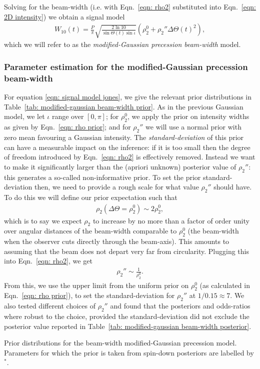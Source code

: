 \documentclass[../full_thesis/full_thesis.tex]{subfiles}
\newcommand{\thisdir}{../comparing_periodic_modulations}
\begin{document}
Solving for the beam-width (i.e. with Eqn.~\eqref{eqn: rho2} substituted into
Eqn.~\eqref{eqn: 2D intensity}) we obtain a signal model
\begin{align}
W_{10}(t) = \frac{P}{\pi}\sqrt{\frac{2\ln10}{\sin\Theta(t)\sin\iota}}
 \left(\rho_2^{0} + \rho_2'' \Delta\Theta(t)^{2} \right),
\label{eqn: signal model jones}
\end{align}
which we will refer to as the \emph{modified-Gaussian precession beam-width} model.

\subsubsection{Parameter estimation for the modified-Gaussian precession
               beam-width}

For equation \eqref{eqn: signal model jones}, we give the relevant prior distributions
in Table~\ref{tab: modified-gaussian beam-width prior}. As in the previous
Gaussian model, we let $\iota$ range over $[0, \pi]$; for $\rho_2^{0}$, we
apply the prior on intensity widths as given by Eqn.~\eqref{eqn: rho
prior}; and for $\rho_2''$ we will use a normal prior with zero mean
favouring a Gaussian intensity. The \emph{standard-deviation} of this prior can
have a measurable impact on the inference: if it is too small then the degree
of freedom introduced by Eqn.~\ref{eqn: rho2} is effectively removed. Instead
we want to make it significantly larger than the (apriori unknown) posterior
value of $\rho_2''$: this generates a so-called non-informative prior. To set
the prior standard-deviation then, we need to provide a rough scale for what
value $\rho_{2}''$ should have. To do this we will define our prior expectation
such that
\begin{align}
\rho_2(\Delta\Theta = \rho_2^0) \sim 2\rho_2^0,
\label{eqn: rho2 prior}
\end{align}
which is to say we expect $\rho_2$ to increase by no more than a factor of
order unity over angular distances of the beam-width comparable to $\rho_2^0$
(the beam-width when the observer cuts directly through the beam-axis). This
amounts to assuming that the beam does not depart very far from circularity.
Plugging this into Eqn.~\eqref{eqn: rho2}, we get
\begin{align}
\rho_2'' \sim \frac{1}{\rho_2^0}.
\label{eqn: rho2dd prior}
\end{align}
From this, we use the upper limit from the uniform prior on $\rho_2^0$ (as calculated in
Eqn.~\eqref{eqn: rho prior}), to set the
standard-deviation for $\rho_2''$ at $1/0.15\approx7$.
We also tested different choices of $\rho_2''$ and found that the
posteriors and odds-ratios where robust to the choice, provided the
standard-deviation did not exclude the posterior value reported in
Table~\ref{tab: modified-gaussian beam-width posterior}.
\begin{table}
\centering
\caption{Prior distributions for the beam-width modified-Gaussian precession
model. Parameters for which the prior is taken from spin-down posteriors are
labelled by $^{*}$.}
\label{tab: modified-gaussian beam-width prior}

\end{table}
\end{document}
